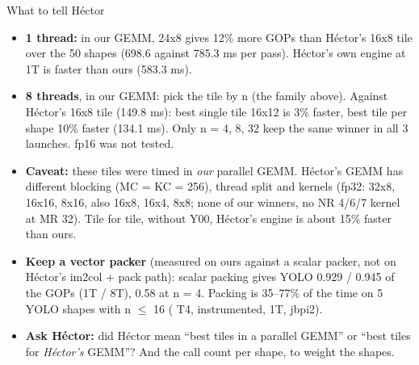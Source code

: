 \begin{frame}{What to tell H\'ector}
\small
\begin{itemize}\setlength\itemsep{5pt}
\item \textbf{1 thread:} in our GEMM, 24x8 gives 12\% more GOPs than H\'ector's 16x8 tile over the 50 shapes (698.6 against 785.3 ms per pass). H\'ector's own engine at 1T is faster than ours (583.3 ms).
\item \textbf{8 threads}, in our GEMM: pick the tile by n (the family above). Against H\'ector's 16x8 tile (149.8 ms): best single tile 16x12 is 3\% faster, best tile per shape 10\% faster (134.1 ms). Only n = 4, 8, 32 keep the same winner in all 3 launches. fp16 was not tested.
\item \textbf{Caveat:} these tiles were timed in \emph{our} parallel GEMM. H\'ector's GEMM has different blocking (MC = KC = 256), thread split and kernels (fp32: 32x8, 16x16, 8x16, also 16x8, 16x4, 8x8; none of our winners, no NR 4/6/7 kernel at MR 32). Tile for tile, without Y00, H\'ector's engine is about 15\% faster than ours.
\item \textbf{Keep a vector packer} (measured on ours against a scalar packer, not on H\'ector's im2col + pack path): scalar packing gives YOLO 0.929 / 0.945 of the GOPs (1T / 8T), 0.58 at n = 4. Packing is 35--77\% of the time on 5 YOLO shapes with n $\le$ 16 ( T4, instrumented, 1T, jbpi2).
\item \textbf{Ask H\'ector:} did H\'ector mean ``best tiles in a parallel GEMM'' or ``best tiles for \emph{H\'ector's} GEMM''? And the call count per shape, to weight the shapes.
\end{itemize}
\end{frame}


